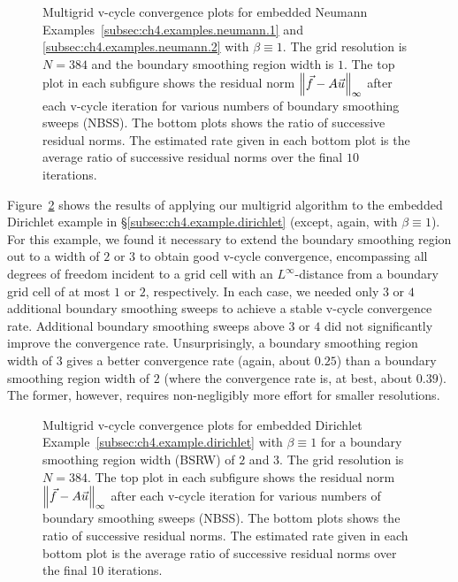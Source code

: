 \setlength{\figurewidth}{0.50\textwidth}
\begin{figure}[htbp]
\centering
{}
\caption{Multigrid v-cycle convergence plots for embedded Neumann Examples~\ref{subsec:ch4.examples.neumann.1} and \ref{subsec:ch4.examples.neumann.2} with $\beta \equiv 1$. The grid resolution is $N = 384$ and the boundary smoothing region width is $1$. The top plot in each subfigure shows the residual norm $\left\lVert  \vec{f} - A\vec{u}  \right\rVert_{\infty}$ after each v-cycle iteration for various numbers of boundary smoothing sweeps (NBSS). The bottom plots shows the ratio of successive residual norms. The estimated rate given in each bottom plot is the average ratio of successive residual norms over the final $10$ iterations.}
\label{fig:ch4.examples.multigrid.neumann}
\end{figure}

Figure~\ref{fig:ch4.examples.multigrid.dirichlet} shows the results of applying our multigrid algorithm to the embedded Dirichlet example in \S\ref{subsec:ch4.example.dirichlet} (except, again, with $\beta \equiv 1$). For this example, we found it necessary to extend the boundary smoothing region out to a width of $2$ or $3$ to obtain good v-cycle convergence, encompassing all degrees of freedom incident to a grid cell with an $L^{\infty}$-distance from a boundary grid cell of at most $1$ or $2$, respectively. In each case, we needed only $3$ or $4$ additional boundary smoothing sweeps to achieve a stable v-cycle convergence rate. Additional boundary smoothing sweeps above $3$ or $4$ did not significantly improve the convergence rate. Unsurprisingly, a boundary smoothing region width of $3$ gives a better convergence rate (again, about $0.25$) than a boundary smoothing region width of $2$ (where the convergence rate is, at best, about $0.39$). The former, however, requires non-negligibly more effort for smaller resolutions.

\setlength{\figurewidth}{0.50\textwidth}
\begin{figure}[htbp]
\centering
{}
\caption{Multigrid v-cycle convergence plots for embedded Dirichlet Example~\ref{subsec:ch4.example.dirichlet} with $\beta \equiv 1$ for a boundary smoothing region width (BSRW) of $2$ and $3$. The grid resolution is $N = 384$. The top plot in each subfigure shows the residual norm $\left\lVert  \vec{f} - A\vec{u}  \right\rVert_{\infty}$ after each v-cycle iteration for various numbers of boundary smoothing sweeps (NBSS). The bottom plots shows the ratio of successive residual norms. The estimated rate given in each bottom plot is the average ratio of successive residual norms over the final $10$ iterations.}
\label{fig:ch4.examples.multigrid.dirichlet}
\end{figure}

